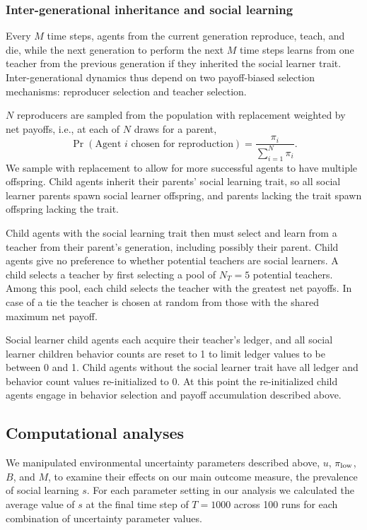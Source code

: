 \documentclass[letterpaper,11.5pt]{scrartcl}
\begin{document}
\subsubsection{Inter-generational inheritance and social learning}

Every $M$ time steps, agents from the current generation reproduce, teach,
and die, while the next generation to perform the next $M$ time steps learns
from one teacher from the previous generation if they inherited the social 
learner trait. Inter-generational dynamics thus depend on 
two payoff-biased selection mechanisms: reproducer selection
and teacher selection. 

$N$ reproducers are sampled from the population with
replacement weighted by net payoffs, i.e., at each of $N$ draws for a parent,
\begin{equation}
  \Pr(\text{Agent $i$ chosen for reproduction}) = \frac{\pi_i}{\sum_{i=1}^N \pi_i}.
\end{equation}
\noindent
We sample with replacement to allow for more successful agents to have multiple
offspring. Child agents inherit their parents' social learning trait, so 
all social learner parents spawn social learner offspring, and parents lacking
the trait spawn offspring lacking the trait. 

Child agents with the social learning trait then must select and learn from a
teacher from their parent's generation, including possibly their parent.
Child agents give no preference to whether potential teachers are social 
learners. A child selects a teacher by first selecting a pool of $N_T = 5$ potential
teachers. Among this pool, each child selects the teacher with the greatest
net payoffs. In case of a tie the teacher is chosen at random from those with
the shared maximum net payoff. 

Social learner child agents each acquire their teacher's ledger, and all social
learner children behavior counts are reset to 1 to limit ledger values to be between
0 and 1. Child agents without the social learner trait have all ledger and behavior
count values re-initialized to 0. At this point the re-initialized child agents
engage in behavior selection and payoff accumulation described above. 


\subsection{Computational analyses}

We manipulated environmental uncertainty parameters described above, $u$,
$\pi_{\mathrm{low}}$, $B$, and $M$, to examine their effects on our
main outcome measure, the prevalence of social learning $s$. For each parameter setting
in our analysis we calculated the average value of $s$ at the final time step
of $T=1000$ across 100 runs for each combination of uncertainty parameter values.
\end{document}
